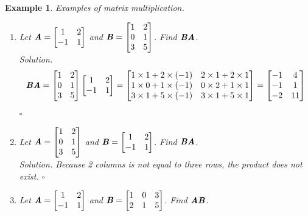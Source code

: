 \documentclass[12pt, a4paper]{article}
\newtheorem{eg}{Example}[subsection]
\newenvironment*{sol}{\indent\textit{Solution. }}{\hfill{$\square$}\par}
\def\matrixA{\textbf{\emph{A}}}
\def\matrixB{\textbf{\emph{B}}}
\begin{document}
\begin{eg}
Examples of matrix multiplication.
\begin{enumerate}
	\item Let $\matrixA=\begin{bmatrix}1&2\\-1&1\end{bmatrix}$ and $\matrixB=\begin{bmatrix}1&2\\0&1\\3&5\end{bmatrix}$. Find $\matrixB\matrixA$.\\
	\begin{sol}\[\matrixB\matrixA=\begin{bmatrix}1&2\\0&1\\3&5\end{bmatrix}\begin{bmatrix}1&2\\-1&1\end{bmatrix}=\begin{bmatrix}1\times1+2\times(-1)&2\times1+2\times1\\1\times0+1\times(-1)&0\times2+1\times1\\3\times1+5\times(-1)&3\times1+5\times1\end{bmatrix}=\begin{bmatrix}-1&4\\-1&1\\-2&11\end{bmatrix}\]\end{sol}
	\item Let $\matrixA=\begin{bmatrix}1&2\\0&1\\3&5\end{bmatrix}$ and $\matrixB=\begin{bmatrix}1&2\\-1&1\end{bmatrix}$. Find $\matrixB\matrixA$.\\
	\begin{sol} Because 2 columns is not equal to three rows, the product does not exist. \end{sol}
	\item Let $\matrixA=\begin{bmatrix}1&2\\-1&1\end{bmatrix}$ and $\matrixB=\begin{bmatrix}1&0&3\\2&1&5\end{bmatrix}$. Find $\matrixA\matrixB$.\\

\end{enumerate}
\end{eg}
\end{document}
